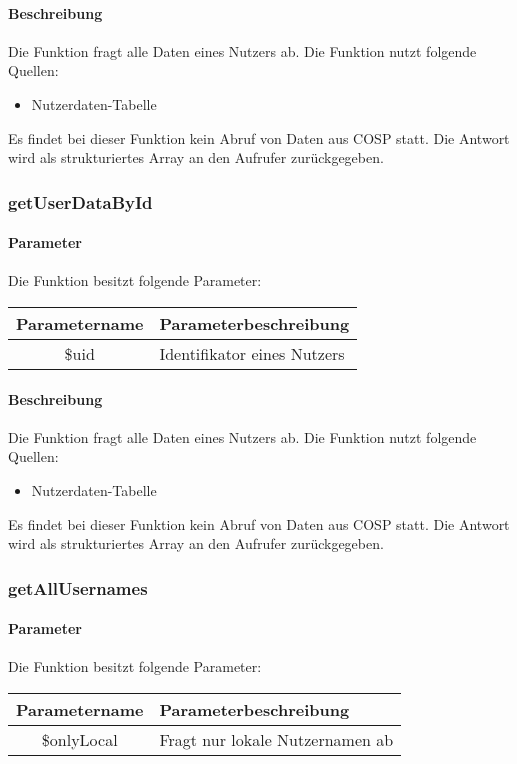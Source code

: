 \paragraph{Beschreibung} Die Funktion fragt alle Daten eines Nutzers ab. Die Funktion nutzt folgende Quellen:
\begin{itemize}
	\item Nutzerdaten-Tabelle
\end{itemize}
Es findet bei dieser Funktion kein Abruf von Daten aus {\glqq COSP\grqq} statt. Die Antwort wird als strukturiertes Array an den Aufrufer zurückgegeben.
\subsubsection{getUserDataById}
\paragraph{Parameter} Die Funktion besitzt folgende Parameter:
\begin{table}[H]
	\begin{tabular}{|c|p{11cm}|}
		\hline
		\textbf{Parametername} & \textbf{Parameterbeschreibung} \\ \hline
		\$uid & Identifikator eines Nutzers \\ \hline
	\end{tabular}
\end{table}
\paragraph{Beschreibung} Die Funktion fragt alle Daten eines Nutzers ab. Die Funktion nutzt folgende Quellen:
\begin{itemize}
	\item Nutzerdaten-Tabelle
\end{itemize}
Es findet bei dieser Funktion kein Abruf von Daten aus {\glqq COSP\grqq} statt. Die Antwort wird als strukturiertes Array an den Aufrufer zurückgegeben.
\subsubsection{getAllUsernames}
\paragraph{Parameter} Die Funktion besitzt folgende Parameter:
\begin{table}[H]
	\begin{tabular}{|c|p{11cm}|}
		\hline
		\textbf{Parametername} & \textbf{Parameterbeschreibung} \\ \hline
		\$onlyLocal & Fragt nur lokale Nutzernamen ab \\ \hline
	\end{tabular}
\end{table}
